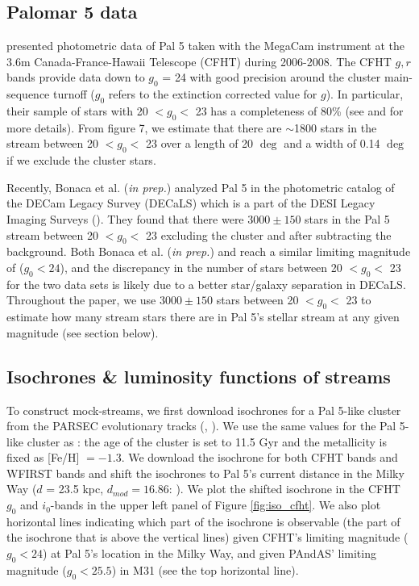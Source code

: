\documentclass[twocolumn]{aastex62}
\begin{document}
\subsection{Palomar 5 data}
\label{sec:pal5}
 \citet{ibata16} presented photometric data of Pal 5 taken with the MegaCam instrument at the 3.6m Canada-France-Hawaii Telescope (CFHT) during 2006-2008. The CFHT $g, r$ bands provide data down to $g_0$ = 24 with good precision around the cluster main-sequence turnoff ($g_0$ refers to the extinction corrected value for $g$). In particular, their sample of stars with 20 $< g_0 <$ 23 has a completeness of 80\% (see \citealt{ibata16} and \citealt{ibata17} for more details). From \citet{ibata16} figure 7, we estimate that there are $\sim$1800 stars in the stream between 20 $< g_0 <$ 23 over a length of 20 $\deg$  and a width of 0.14 $\deg$ if we exclude the cluster stars. 
 

Recently, Bonaca et al. ({\it in prep.}) analyzed Pal 5 in the photometric catalog of the DECam Legacy Survey (DECaLS) which is a part of the DESI Legacy Imaging Surveys (\citealt{dey2019}). They found that there were $3000 \pm 150$ stars in the Pal 5 stream between 20 $< g_0 <$ 23 excluding the cluster and after subtracting the background. Both Bonaca et al. ({\it in prep.}) and  \citet{ibata16} reach a similar limiting magnitude of ($g_0 < 24$), and the discrepancy in the number of stars  between 20 $< g_0 <$ 23 for the two data sets is likely due to a better star/galaxy separation in DECaLS. Throughout the paper, we use $3000 \pm 150$ stars between 20 $< g_0 <$ 23 to estimate how many stream stars there are in Pal 5's stellar stream at any given magnitude (see section below).

\subsection{Isochrones \& luminosity functions of streams}
\label{sec:lum}
To construct mock-streams, we first download isochrones for a Pal 5-like cluster from the PARSEC evolutionary tracks (\citealt{bressan12}, \citealt{margio17}). We use the same values for the Pal 5-like cluster as \citet{ibata17}: the age of the cluster is set to 11.5 Gyr and the metallicity is fixed as [Fe/H] $= -1.3$. We download the isochrone for both CFHT bands and WFIRST bands and shift the isochrones to Pal 5's current distance in the Milky Way ($d$ = 23.5 kpc, $d_{mod} = 16.86$: \citealt{dotter11}). We plot the shifted isochrone in the CFHT $g_0$ and $i_0$-bands in the upper left panel of Figure \ref{fig:iso_cfht}.  We also plot horizontal lines indicating which part of the isochrone is observable (the part of the isochrone that is above the vertical lines) given CFHT's limiting magnitude  ($g_0 < 24$) at Pal 5's location in the Milky Way, and given PAndAS' limiting magnitude ($g_0 < 25.5$) in M31 (see the top horizontal line). 
\end{document}
